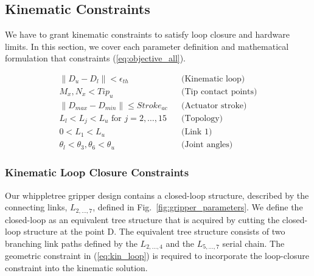 \documentclass[letterpaper, 10 pt, conference]{ieeeconf}  %
\newcommand{\fig}[1]{Fig.~\ref{#1}}
\newcommand{\eq}[1]{(\ref{#1})}
\newcommand{\norm}[1]{\| #1 \|}
\newcommand{\abs}[1]{\lvert #1 \rvert}
\begin{document}
\subsection{Kinematic Constraints}
We have to grant kinematic constraints to satisfy loop closure and hardware limits. In this section, we cover each parameter definition and mathematical formulation that constraints \eq{eq:objective_all}. 

\begin{figure}[h!]
\begin{subequations}
\label{eq:all_const}
\begin{flalign}
    \norm{D_{u}-D_{l}} < \epsilon_{{th}} && \text{(Kinematic loop)}\label{eq:kin_loop}\\
    M_x, N_x < Tip_{u} && \text{(Tip contact points)}\label{eq:const_tip}\\
    \norm{D_{max}-D_{min}} \leq Stroke_{ac} && \text{(Actuator stroke)}\label{eq:const_stroke}\\
    L_{l} < L_j < L_{u} \text{ for } j = 2,\dots,15 &&  \text{(Topology)}\label{eq:const_topo}\\
    0 < L_1 < L_{u} && \text{(Link 1)} \label{eq:const_link1}\\
    \theta_l < \theta_3, \theta_6 < \theta_u &&  \text{(Joint angles)}\label{eq:const_theta3}
\end{flalign}
\end{subequations}
\end{figure}

\subsubsection{Kinematic Loop Closure Constraints}
Our whippletree gripper design contains a closed-loop structure, described by the connecting links, $L_{2,\dots,7}$, defined in \fig{fig:gripper_parameters}. %
We define the closed-loop as an equivalent tree structure that is acquired by cutting the closed-loop structure at the point D. The equivalent tree structure consists of two branching link paths defined by the $L_{2,\dots,4}$ and the $L_{5,\dots,7}$ serial chain. The geometric constraint in \eq{eq:kin_loop} is required to incorporate the loop-closure constraint into the kinematic solution.

\end{document}
